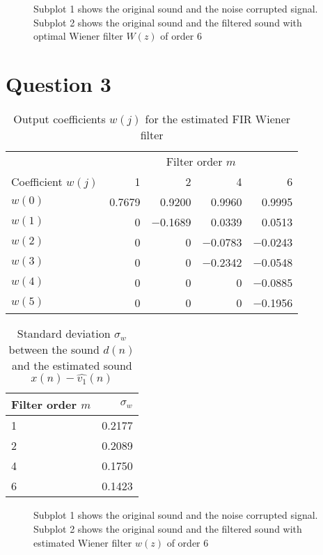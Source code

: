 \documentclass[12pt,a4paper]{article}
\begin{document}
\begin{figure}[b!]
\centering

\caption{Subplot 1 shows the original sound and the noise corrupted signal. Subplot 2 shows the original sound and the filtered sound with optimal Wiener filter $W(z)$ of order \num{6}}
\end{figure}

\clearpage\section*{Question 3}

\begin{table}[h!]
\centering
\caption{Output coefficients $w(j)$ for the estimated FIR Wiener filter}
\begin{tabular}{l r r r r}
\hline
 & \multicolumn{4}{c}{Filter order $m$}\\
 \cline{2-5}
Coefficient $w(j)$ & \num{1} & \num{2} & \num{4} & \num{6} \\
\hline
$w(0)$ & \num{0.7679} & \num{0.9200}& \num{0.9960} & \num{0.9995} \\
$w(1)$ & \num{0} & \num{-0.1689}& \num{0.0339}& \num{0.0513} \\
$w(2)$ & \num{0}& \num{0}& \num{-0.0783}& \num{-0.0243}\\
$w(3)$ & \num{0}& \num{0}& \num{-0.2342}& \num{-0.0548}\\
$w(4)$ & \num{0}& \num{0}& \num{0}& \num{-0.0885}\\
$w(5)$ & \num{0}& \num{0}& \num{0}& \num{-0.1956}\\
\hline
\end{tabular}
\end{table}

\begin{table}[h!]
\centering
\caption{Standard deviation $\sigma_{w}$ between the sound $d(n)$ and the estimated sound $x(n) - \hat{v_{1}}(n)$}
\begin{tabular}{l | r}
Filter order $m$ & $\sigma_{w}$ \\
\hline
\num{1} & \num{0.2177}\\
\num{2} & \num{0.2089}\\
\num{4} & \num{0.1750}\\
\num{6} & \num{0.1423}\\
\hline
\end{tabular}
\end{table}

\begin{figure}[h!]
\centering

\caption{Subplot 1 shows the original sound and the noise corrupted signal. Subplot 2 shows the original sound and the filtered sound with estimated Wiener filter $w(z)$ of order \num{6}}
\end{figure}
\end{document}

